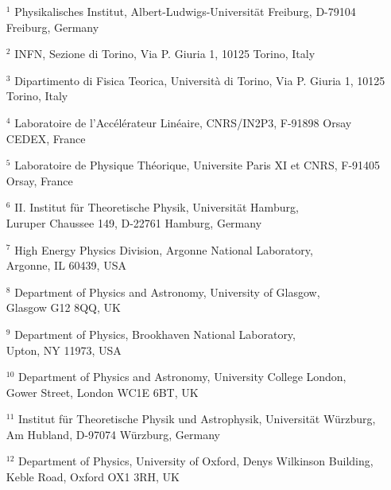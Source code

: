 \begin{itemize}

\item[$^{1}$] 
  Physikalisches Institut, Albert-Ludwigs-Universit\"at Freiburg,
  D-79104 Freiburg, Germany

\item[$^{2}$] 
 INFN, Sezione di Torino, Via P. Giuria 1, 10125 Torino, Italy

\item[$^{3}$] 
  Dipartimento di Fisica Teorica, Universit\`a di Torino,  Via P.
  Giuria 1, 10125 Torino, Italy

\item[$^{4}$] 
  Laboratoire de l'Acc\'el\'erateur Lin\'eaire, CNRS/IN2P3, 
  F-91898 Orsay CEDEX, France


\item[$^{5}$] 
 Laboratoire de Physique Th\'eorique, Universite Paris XI et CNRS, 
 F-91405 Orsay, France 

\item[$^{6}$] 
  II. Institut f\"ur Theoretische Physik, Universit\"at Hamburg, \\
  Luruper Chaussee 149, D-22761 Hamburg, Germany

\item[$^{7}$] 
  High Energy Physics Division, Argonne National Laboratory, \\
  Argonne, IL 60439, USA 

\item[$^{8}$] 
  Department of Physics and Astronomy, University of Glasgow, \\
  Glasgow G12 8QQ, UK

\item[$^{9}$] 
 Department of Physics, Brookhaven National Laboratory, \\
 Upton, NY 11973, USA 

\item[$^{10}$] 
  Department of Physics and Astronomy, University College London, \\
  Gower Street, London WC1E 6BT, UK 

\item[$^{11}$] 
  Institut f\"ur Theoretische Physik und Astrophysik, Universit\"at W\"urzburg, \\ 
  Am Hubland, D-97074 W\"urzburg, Germany

\item[$^{12}$] 
  Department of Physics, University of Oxford, Denys Wilkinson Building, \\
  Keble Road, Oxford OX1 3RH, UK


\end{itemize}
